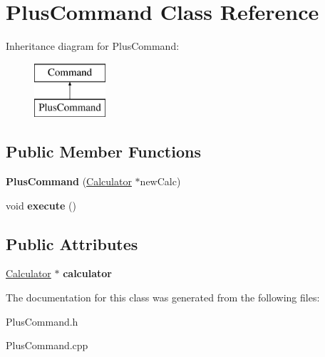 \hypertarget{class_plus_command}{}\section{Plus\+Command Class Reference}
\label{class_plus_command}
Inheritance diagram for Plus\+Command\+:\begin{figure}[H]
\begin{center}
\leavevmode
\includegraphics[height=2.000000cm]{class_plus_command}
\end{center}
\end{figure}
\subsection*{Public Member Functions}
\begin{DoxyCompactItemize}
\item 
\hypertarget{class_plus_command_a687cab12cc701d06dcf998c42c30bc31}{}{\bfseries Plus\+Command} (\hyperlink{class_calculator}{Calculator} $\ast$new\+Calc)\label{class_plus_command_a687cab12cc701d06dcf998c42c30bc31}

\item 
\hypertarget{class_plus_command_a43c95e8e8ac4260f507f92d9d40f0699}{}void {\bfseries execute} ()\label{class_plus_command_a43c95e8e8ac4260f507f92d9d40f0699}

\end{DoxyCompactItemize}
\subsection*{Public Attributes}
\begin{DoxyCompactItemize}
\item 
\hypertarget{class_plus_command_a6dd3da59e837ac5bcd1063ecc5895f0e}{}\hyperlink{class_calculator}{Calculator} $\ast$ {\bfseries calculator}\label{class_plus_command_a6dd3da59e837ac5bcd1063ecc5895f0e}

\end{DoxyCompactItemize}


The documentation for this class was generated from the following files\+:\begin{DoxyCompactItemize}
\item 
Plus\+Command.\+h\item 
Plus\+Command.\+cpp\end{DoxyCompactItemize}
